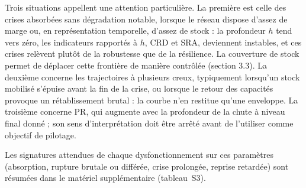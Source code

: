 Trois situations appellent une attention particulière. La première est celle des crises absorbées sans dégradation notable, lorsque le réseau dispose d'assez de marge ou, en représentation temporelle, d'assez de stock : la profondeur $h$ tend vers zéro, les indicateurs rapportés à $h$, CRD et SRA, deviennent instables, et ces crises relèvent plutôt de la robustesse que de la résilience. La couverture de stock permet de déplacer cette frontière de manière contrôlée (section 3.3). La deuxième concerne les trajectoires à plusieurs creux, typiquement lorsqu'un stock mobilisé s'épuise avant la fin de la crise, ou lorsque le retour des capacités provoque un rétablissement brutal : la courbe n'en restitue qu'une enveloppe. La troisième concerne PR, qui augmente avec la profondeur de la chute à niveau final donné ; son sens d'interprétation doit être arrêté avant de l'utiliser comme objectif de pilotage.

Les signatures attendues de chaque dysfonctionnement sur ces paramètres (absorption, rupture brutale ou différée, crise prolongée, reprise retardée) sont résumées dans le matériel supplémentaire (tableau~S3).
